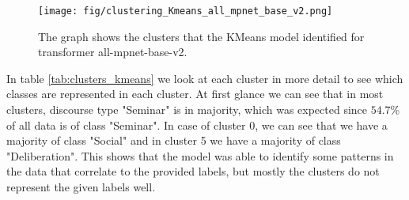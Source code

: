 \documentclass[fleqn,moreauthors,10pt]{ds_report}
\begin{document}
\begin{figure}[htb]
    \centering
    \texttt{[image: fig/clustering\_Kmeans\_all\_mpnet\_base\_v2.png]}

    \caption{The graph shows the clusters that the KMeans model identified for transformer all-mpnet-base-v2.}
    \label{fig:kmeans}
\end{figure}

In table \ref{tab:clusters_kmeans} we look at each cluster in more detail to see which classes are represented in each cluster. At first glance we can see that in most clusters,
discourse type "Seminar" is in majority, which was expected since \(54.7\)\% of all data is of class "Seminar". In case of cluster 0, we can see that we have a majority of class "Social" and in cluster 5 
we have a majority of class "Deliberation". This shows that the model was able to identify some patterns in the data that correlate to the provided labels, but mostly the clusters do not represent the given labels well.

\begin{table}[h]
    \centering
    \caption{Cluster composition percentages using K-means with embeddings from transformer all-mpnet-base-v2.}
    \label{tab:clusters_kmeans}
    \end{table}
\end{document}
